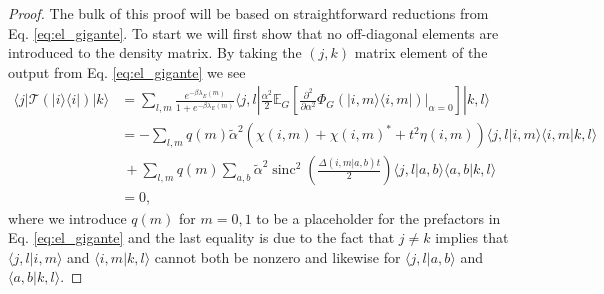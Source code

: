 \documentclass{article}
\newcommand{\ket}[1]{|#1\rangle}
\newcommand{\bra}[1]{\langle #1|}
\newcommand{\braket}[2]{\langle #1|#2\rangle}
\newcommand{\ketbra}[2]{| #1\rangle\! \langle #2|}
\DeclareMathOperator{\sinc}{sinc}
\begin{document}
\begin{proof}
    The bulk of this proof will be based on straightforward reductions from Eq. \eqref{eq:el_gigante}. To start we will first show that no off-diagonal elements are introduced to the density matrix. By taking the $(j,k)$ matrix element of the output from Eq. \eqref{eq:el_gigante} we see
    \begin{align}
        \bra{j} \mathcal{T}(\ketbra{i}{i})\ket{k} &= \sum_{l, m} \frac{e^{-\beta \lambda_E(m)}}{1 + e^{-\beta \lambda_E(m)}} \bra{j, l} \frac{\alpha^2}{2} \mathbb{E}_{G} \left[ \frac{\partial^2}{\partial \alpha^2} \Phi_G(\ketbra{i, m}{i, m}) \big|_{\alpha = 0} \right] \ket{k, l} \\
        &= - \sum_{l,m} q(m) \widetilde{\alpha}^2 (\chi(i,m) + \chi(i,m)^* + t^2 \eta(i,m)) \braket{j, l}{i, m} \braket{i, m}{k, l} \nonumber \\
        &~ + \sum_{l, m} q(m) \sum_{a,b} \widetilde{\alpha}^2 \sinc^2 \left(\frac{\Delta(i,m|a,b)t }{2} \right) \braket{j, l}{a,b} \braket{a, b}{k, l} \\
        &= 0,
    \end{align}
    where we introduce $q(m)$ for $m=0,1$ to be a placeholder for the prefactors in Eq. \eqref{eq:el_gigante} and the last equality is due to the fact that $j \neq k$ implies that $\braket{j, l}{i,m}$ and $\braket{i,m}{k, l}$ cannot both be nonzero and likewise for $\braket{j, l}{a,b}$ and $\braket{a,b}{k,l}$.
    

\end{proof}
\end{document}
